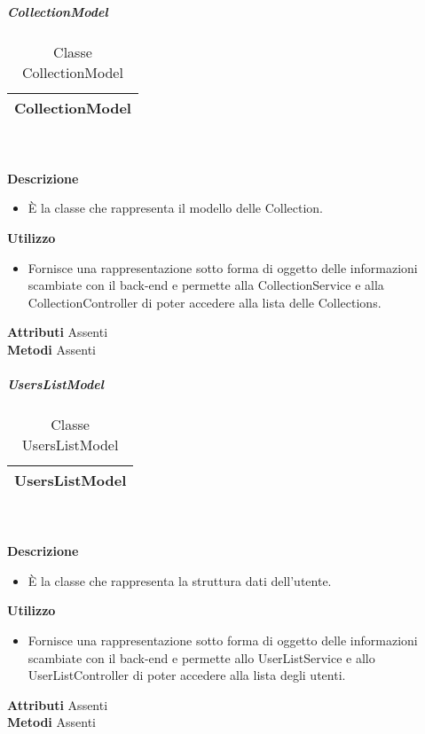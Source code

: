 			\subparagraph{CollectionModel} 
\begin{table}[ht]
\begin{center}
\bgroup
	\setlength{\arrayrulewidth}{0.6mm}
	\def\arraystretch{1}
		\begin{tabular}{ | p{12cm} | }
				\hline  
					\centerline{\textbf{CollectionModel}}
		\\ \hline 
				\hline
				\hline
		
		\end{tabular}
\egroup
\caption{Classe CollectionModel}
\end{center}
\end{table} \textbf{\\ \\ Descrizione}
\begin{itemize}
\item[] È la classe che rappresenta il modello delle Collection.
\end{itemize} 
\textbf{Utilizzo}
\begin{itemize}
\item[] Fornisce una rappresentazione sotto forma di oggetto delle informazioni scambiate con il back-end e permette alla CollectionService e alla CollectionController di poter accedere alla lista delle Collections.
\end{itemize}
\textbf{Attributi}
Assenti \\
\textbf{Metodi}
Assenti \\

			\subparagraph{UsersListModel} 
\begin{table}[ht]
\begin{center}
\bgroup
	\setlength{\arrayrulewidth}{0.6mm}
	\def\arraystretch{1}
		\begin{tabular}{ | p{12cm} | }
				\hline  
					\centerline{\textbf{UsersListModel}}
		\\ \hline 
				\hline
				\hline
		
		\end{tabular}
\egroup
\caption{Classe UsersListModel}
\end{center}
\end{table} \textbf{\\ \\ Descrizione}
\begin{itemize}
\item[] È la classe che rappresenta la struttura dati dell'utente.
\end{itemize} 
\textbf{Utilizzo}
\begin{itemize}
\item[] Fornisce una rappresentazione sotto forma di oggetto delle informazioni scambiate con il back-end e permette allo UserListService e allo UserListController di poter accedere alla lista degli utenti.
\end{itemize}
\textbf{Attributi}
Assenti \\
\textbf{Metodi}
Assenti \\
